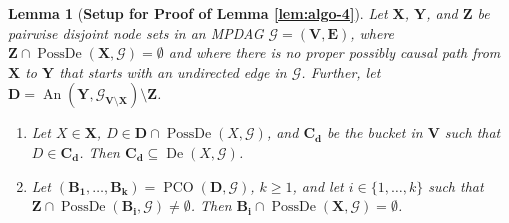 \documentclass[11pt]{article}
\DeclareMathOperator{\An}{An}
\DeclareMathOperator{\De}{De}
\DeclareMathOperator{\PossDe}{PossDe}
\DeclareMathOperator{\PCO}{PCO}
\newtheorem{lemma}[theorem]{Lemma}
\newcommand{\mb}[1]{\mathbf{#1}}
\newcommand{\g}[1][G]{\mathcal{#1}}
\begin{document}

\begin{lemma}[\textbf{Setup for Proof of Lemma \ref{lem:algo-4}}]
\label{lem:algo-4efghi} 
    Let $\mb{X}$, $\mb{Y}$, and $\mb{Z}$ be pairwise disjoint node sets in an MPDAG $\g =(\mb{V,E})$, where $\mb{Z} \cap \PossDe(\mb{X},\g) = \emptyset$ and where there is no proper possibly causal path from $\mb{X}$ to $\mb{Y}$ that starts with an undirected edge in $\g$. Further, let $\mb{D} =\An(\mb{Y},\g_{\mb{V} \setminus \mb{X}}) \setminus \mb{Z}$.
    \begin{enumerate}[label=(\roman*)] 
        \item \label{lem:algo-4e}
        Let $X \in \mb{X}$, $D \in \mb{D} \cap \PossDe(X, \g)$, and $\mb{C_d}$ be the bucket in $\mb{V}$ such that $D \in \mb{C_d}$. Then $\mb{C_d} \subseteq \De(X, \g)$.
    
        \item \label{lem:algo-4f}
        Let $(\mb{B_1}, \dots, \mb{B_k}) = \PCO(\mb{D},\g)$, $k \ge 1$, and let $i \in \{1, \dots, k\}$ such that $\mb{Z} \cap \PossDe(\mb{B_i}, \g) \neq \emptyset$. Then $\mb{B_i} \cap \PossDe(\mb{X}, \g) = \emptyset$.
    \end{enumerate}
\end{lemma}
\end{document}
